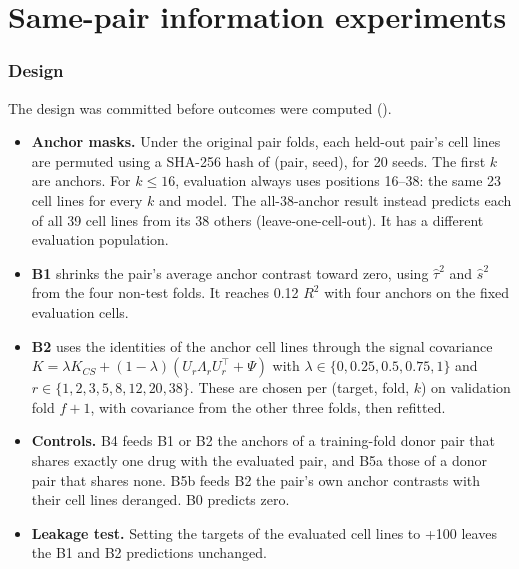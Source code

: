 \documentclass[11pt]{article}
\begin{document}
\section{Same-pair information experiments}\label{sec:S5}
\subsubsection*{Design} The design was committed before outcomes were computed ().

\begin{itemize}
\item \textbf{Anchor masks.} Under the original pair folds, each held-out pair's cell lines are permuted using a SHA-256 hash of (pair, seed), for 20 seeds. The first $k$ are anchors. For $k\le16$, evaluation always uses positions 16–38: the same 23 cell lines for every $k$ and model. The all-38-anchor result instead predicts each of all 39 cell lines from its 38 others (leave-one-cell-out). It has a different evaluation population.
\item \textbf{B1} shrinks the pair's average anchor contrast toward zero, using $\hat\tau^2$ and $\hat s^2$ from the four non-test folds. It reaches 0.12 $R^2$ with four anchors on the fixed evaluation cells.
\item \textbf{B2} uses the identities of the anchor cell lines through the signal covariance $K=\lambda K_{CS}+(1-\lambda)(U_r\Lambda_rU_r^\top+\Psi)$ with $\lambda\in\{0,0.25,0.5,0.75,1\}$ and $r\in\{1,2,3,5,8,12,20,38\}$. These are chosen per (target, fold, $k$) on validation fold $f+1$, with covariance from the other three folds, then refitted.
\item \textbf{Controls.} B4 feeds B1 or B2 the anchors of a training-fold donor pair that shares exactly one drug with the evaluated pair, and B5a those of a donor pair that shares none. B5b feeds B2 the pair's own anchor contrasts with their cell lines deranged. B0 predicts zero.
\item \textbf{Leakage test.} Setting the targets of the evaluated cell lines to +100 leaves the B1 and B2 predictions unchanged.
\end{itemize}
\end{document}

